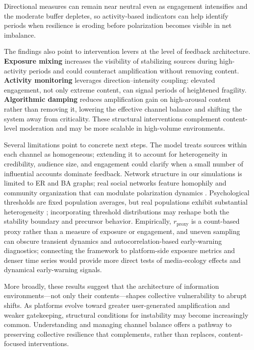 \documentclass[11pt]{article}
\begin{document}
Directional measures can remain near neutral even as engagement intensifies and the moderate buffer depletes, so activity-based indicators can help identify periods when resilience is eroding before polarization becomes visible in net imbalance.

The findings also point to intervention levers at the level of feedback architecture. \textbf{Exposure mixing} increases the visibility of stabilizing sources during high-activity periods and could counteract amplification without removing content. \textbf{Activity monitoring} leverages direction--intensity coupling: elevated engagement, not only extreme content, can signal periods of heightened fragility. \textbf{Algorithmic damping} reduces amplification gain on high-arousal content rather than removing it, lowering the effective channel balance and shifting the system away from criticality. These structural interventions complement content-level moderation and may be more scalable in high-volume environments.

Several limitations point to concrete next steps. The model treats sources within each channel as homogeneous; extending it to account for heterogeneity in credibility, audience size, and engagement could clarify when a small number of influential accounts dominate feedback. Network structure in our simulations is limited to ER and BA graphs; real social networks feature homophily and community organization that can modulate polarization dynamics \citep{McPherson2001,Dandekar2013}. Psychological thresholds are fixed population averages, but real populations exhibit substantial heterogeneity \citep{Schwartz2013,Pfefferbaum2020}; incorporating threshold distributions may reshape both the stability boundary and precursor behavior. Empirically, $r_{\text{proxy}}$ is a count-based proxy rather than a measure of exposure or engagement, and uneven sampling can obscure transient dynamics and autocorrelation-based early-warning diagnostics; connecting the framework to platform-side exposure metrics and denser time series would provide more direct tests of media-ecology effects and dynamical early-warning signals.

More broadly, these results suggest that the architecture of information environments---not only their contents---shapes collective vulnerability to abrupt shifts. As platforms evolve toward greater user-generated amplification and weaker gatekeeping, structural conditions for instability may become increasingly common. Understanding and managing channel balance offers a pathway to preserving collective resilience that complements, rather than replaces, content-focused interventions.
\end{document}
